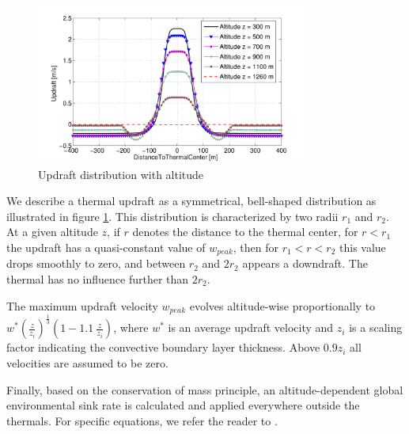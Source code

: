 \documentclass{ifacconf}
\begin{document}

\begin{figure}%
\begin{center}
 \includegraphics[width=9cm]{img/total_updraft.pdf}
\end{center}
 \caption{Updraft distribution with altitude}
 \label{fig:updraft_distribution}
\end{figure}


We describe a thermal updraft as a symmetrical, bell-shaped distribution as illustrated in figure \ref{fig:updraft_distribution}. This distribution is characterized by two radii $r_1$ and $r_2$. At a given altitude $z$, if $r$ denotes the distance to the thermal center, for $r<r_1$ the updraft has a quasi-constant value of $w_{peak}$, then for $r_1<r<r_2$ this value drops smoothly to zero, and between $r_2$ and $2r_2$ appears a downdraft. The thermal has no influence further than $2r_2$.

The maximum updraft velocity $w_{peak}$ evolves altitude-wise proportionally to $w^* \left( \frac{z}{z_i} \right)^{\frac{1}{3}} \left(1 - 1.1 \ \frac{z}{z_i}\right)$, where $w^*$ is an average updraft velocity and $z_i$ is a scaling factor indicating the convective boundary layer thickness.
Above $0.9z_i$ all velocities are assumed to be zero.

Finally, based on the conservation of mass principle, an altitude-dependent global environmental sink rate is calculated and applied everywhere outside the thermals. For specific equations, we refer the reader to \cite{allen_thermal}.
\end{document}
